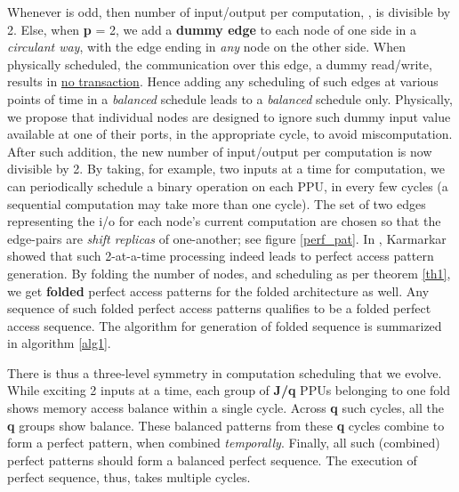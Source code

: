 \documentclass[12pt]{article}
\begin{document}
Whenever  is odd, then number of input/output
per computation, {\large },
is divisible by 2. Else, when \textbf{p} = 2, we add a \textbf{dummy edge} to each
node of one side in a \textit{circulant way}, with the edge ending in
\textit{any} node on the
other side. When physically scheduled, the communication over this edge, a
dummy read/write, results in \uline{no transaction}. Hence adding any
scheduling of such edges at various points of time in a \textit{balanced}
schedule leads to a \textit{balanced} schedule only. Physically,
we propose that individual nodes are designed to ignore such dummy input
value available at one of their ports, in the appropriate cycle, to avoid
miscomputation. After such addition, the new number of
input/output per computation is now divisible by 2. By taking, for example,
two inputs at a time for computation, we can periodically schedule a binary
operation on each PPU, in every few cycles (a sequential
computation may take more than one cycle). The set of two
edges representing the i/o for each node's current computation are chosen
so that the edge-pairs are \textit{shift
replicas} of one-another; see figure \ref{perf_pat}. In
\cite{karm1}, Karmarkar showed
that such 2-at-a-time processing indeed leads to perfect access pattern
generation. By folding the number of nodes,
and scheduling as per theorem \ref{th1}, we get \textbf{folded}
perfect access patterns for the folded architecture as well. Any
sequence of such folded perfect access patterns qualifies to be a folded
perfect access sequence. The algorithm for generation of
folded sequence is summarized in algorithm \ref{alg1}.

There is thus a three-level symmetry in computation scheduling
that we evolve. While exciting 2 inputs at a time, each group of \textbf{J/q}
PPUs belonging to one fold shows memory access
balance within a single cycle. Across
\textbf{q} such cycles, all the \textbf{q} groups show balance. These
balanced patterns from these \textbf{q} cycles combine to form a perfect
pattern, when combined \textit{temporally}. Finally, all such (combined) perfect
patterns should form a balanced perfect sequence. The execution of
perfect sequence, thus, takes multiple cycles.
\end{document}
